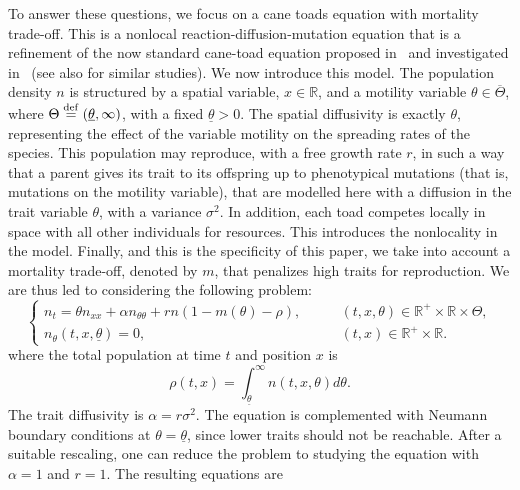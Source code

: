 \documentclass[11pt]{article}    %
\newcommand{\R}{\mathbb{R}}
\begin{document}
To answer these questions, we focus on a cane toads equation with mortality trade-off. This is a nonlocal reaction-diffusion-mutation equation that is a refinement of the now standard cane-toad equation proposed in~\cite{BenichouEtAl} and investigated in~\cite{BerestyckiMouhotRaoul,BouinCalvez,BHR_LogDelay,BHR_Acceleration,Turanova} (see also \cite{ArnoldDesvillettesPrevost, BouinMirrahimi, ChampagnatMeleard, LamLou, %
PerthameSouganidis} for similar studies).  We now introduce this model. 
The population density $n$ is structured by a spatial variable, $x\in \R$, and a 
motility variable $\theta\in \overline\Theta$, where $\Theta\stackrel{\rm def}{=}(\underline\theta, \infty)$, with a  fixed   $\underline\theta>0$. The spatial diffusivity is  exactly $\theta$, representing the effect of the variable motility on the spreading rates of the species.
This population may reproduce, with a free growth rate $r$, in such a way that a parent gives its trait to its offspring up to phenotypical mutations (that is, mutations on the motility variable), that are modelled here with a diffusion in the trait variable $\theta$, with a variance $\sigma^2$. In addition, each toad competes locally in space with all other individuals for resources. This introduces the nonlocality in the model. Finally, and this is the specificity of this paper, we take into account a mortality trade-off, denoted by $m$, that penalizes high traits for reproduction. We are thus led to considering the following problem:
%
\begin{equation*}
\begin{cases}
n_t = \theta n_{xx} + \alpha n_{\theta\theta} + r n \left( 1 - m(\theta) - \rho\right), &\qquad (t,x,\theta) \in \R^+ \times \R \times \Theta,\\
n_\theta(t,x,\underline\theta) = 0, & \qquad (t,x) \in \R^+ \times \R. 
\end{cases}
\end{equation*}
where the total population at time $t$ and position $x$ is
\begin{equation*}\label{eq:rho}
\rho(t,x)=\int_{\underline\theta}^\infty n(t,x,\theta)d\theta.
\end{equation*} 
The trait diffusivity is $\alpha = r \sigma^2$. The equation is complemented with Neumann boundary conditions at $\theta = \underline\theta$, since lower traits should not be reachable. After a suitable rescaling, one can reduce the problem to studying the equation with $\alpha = 1$ and $r=1$.  The resulting equations are
\end{document}
